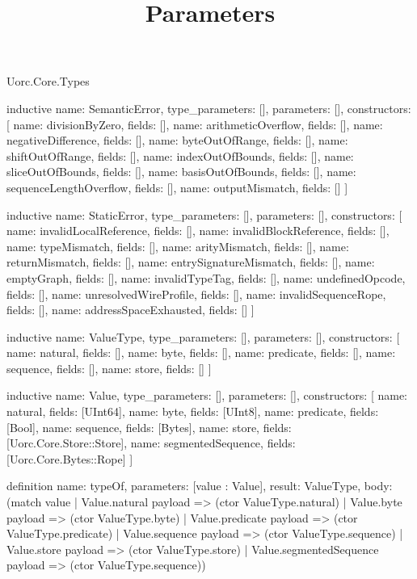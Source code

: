 \begin{lexlean}{Uorc.Core.Types}
\title{Parameters}
\begin{semanticmodule}
inductive{
  name: SemanticError,
  type_parameters: [],
  parameters: [],
  constructors: [
    {name: divisionByZero, fields: []},
    {name: arithmeticOverflow, fields: []},
    {name: negativeDifference, fields: []},
    {name: byteOutOfRange, fields: []},
    {name: shiftOutOfRange, fields: []},
    {name: indexOutOfBounds, fields: []},
    {name: sliceOutOfBounds, fields: []},
    {name: basisOutOfBounds, fields: []},
    {name: sequenceLengthOverflow, fields: []},
    {name: outputMismatch, fields: []}
  ]
}

inductive{
  name: StaticError,
  type_parameters: [],
  parameters: [],
  constructors: [
    {name: invalidLocalReference, fields: []},
    {name: invalidBlockReference, fields: []},
    {name: typeMismatch, fields: []},
    {name: arityMismatch, fields: []},
    {name: returnMismatch, fields: []},
    {name: entrySignatureMismatch, fields: []},
    {name: emptyGraph, fields: []},
    {name: invalidTypeTag, fields: []},
    {name: undefinedOpcode, fields: []},
    {name: unresolvedWireProfile, fields: []},
    {name: invalidSequenceRope, fields: []},
    {name: addressSpaceExhausted, fields: []}
  ]
}

inductive{
  name: ValueType,
  type_parameters: [],
  parameters: [],
  constructors: [
    {name: natural, fields: []},
    {name: byte, fields: []},
    {name: predicate, fields: []},
    {name: sequence, fields: []},
    {name: store, fields: []}
  ]
}

inductive{
  name: Value,
  type_parameters: [],
  parameters: [],
  constructors: [
    {name: natural, fields: [UInt64]},
    {name: byte, fields: [UInt8]},
    {name: predicate, fields: [Bool]},
    {name: sequence, fields: [Bytes]},
    {name: store, fields: [Uorc.Core.Store::Store]},
    {name: segmentedSequence, fields: [Uorc.Core.Bytes::Rope]}
  ]
}

definition{
  name: typeOf,
  parameters: [value : Value],
  result: ValueType,
  body: (match value
    | Value.natural payload => (ctor ValueType.natural)
    | Value.byte payload => (ctor ValueType.byte)
    | Value.predicate payload => (ctor ValueType.predicate)
    | Value.sequence payload => (ctor ValueType.sequence)
    | Value.store payload => (ctor ValueType.store)
    | Value.segmentedSequence payload => (ctor ValueType.sequence))
}


\end{semanticmodule}
\end{lexlean}
